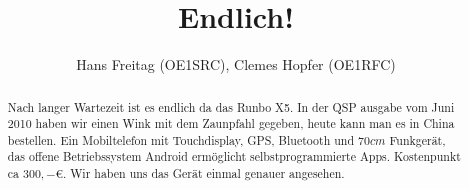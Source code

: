 \documentclass{article}
\begin{document}
\title{Endlich!}
\author{Hans Freitag (OE1SRC), Clemes Hopfer (OE1RFC)}
\maketitle
\begin{abstract}
Nach langer Wartezeit ist es endlich da das Runbo X5. In der QSP ausgabe vom Juni 2010 haben wir einen Wink mit dem Zaunpfahl gegeben, heute 
kann man es in China bestellen. Ein Mobiltelefon mit Touchdisplay, GPS, Bluetooth und $70cm$ Funkgerät, das offene Betriebssystem Android 
ermöglicht selbstprogrammierte Apps. Kostenpunkt ca $300,- \euro$. Wir haben uns das Gerät einmal genauer angesehen. 
\end{abstract}
\end{document}
